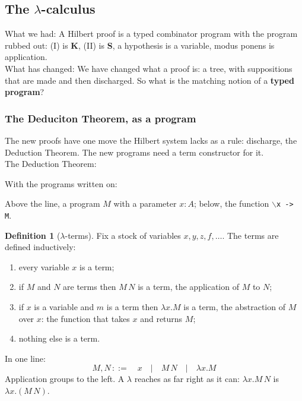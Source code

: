 \documentclass[a4paper, 11pt]{article}
\theoremstyle{definition}
\newtheorem{definition}{Definition}[section]
\begin{document}
\subsection{The $\lambda$-calculus}
What we had: A Hilbert proof is a typed combinator program with the program rubbed out: (I) is \textbf{K}, (II) is
\textbf{S}, a hypothesis is a variable, modus ponens is application. \\
What has changed: We have changed what a proof is: a tree, with suppositions that are made and then discharged. So what
is the matching notion of a \textbf{typed program}?

\subsubsection{The Deduciton Theorem, as a program}
The new proofs have one move the Hilbert system lacks as a rule: discharge, the Deduction Theorem. The new programs need
a term constructor for it. \\
The Deduction Theorem:
\begin{prooftree}
\end{prooftree}
With the programs written on:
\begin{prooftree}
\end{prooftree}
Above the line, a program $M$ with a parameter $x:A$; below, the function \texttt{$\backslash$x -> M}.

\newpage
\begin{definition}[$\lambda$-terms]
    Fix a stock of variables $x, y, z, f, \dots$. The terms are defined inductively: 
    \begin{enumerate}
        \item every variable $x$ is a term;
        \item if $M$ and $N$ are terms then $M \, N$ is a term, the application of $M$ to $N$;
        \item if $x$ is a variable and $m$ is a term then $\lambda x. M$ is a term, the abstraction of $M$ over $x$: the
        function that takes $x$ and returns $M$; 
        \item nothing else is a term.
    \end{enumerate}
    In one line:
    \[M, N \, ::= \quad x \quad | \quad M \, N \quad | \quad \lambda x.M\]
    Application groups to the left. A $\lambda$ reaches as far right as it can: $\lambda x. M \, N$ is $\lambda x. (M \, N)$.
\end{definition}
\end{document}

